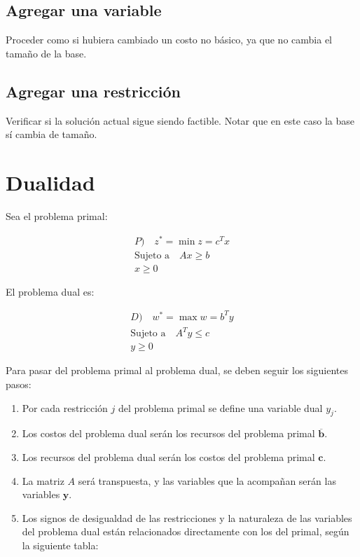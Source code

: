 \documentclass{article}
\begin{document}
\subsection{Agregar una variable}

Proceder como si hubiera cambiado un costo no básico, ya que no cambia el tamaño de la base.

\subsection{Agregar una restricción}

Verificar si la solución actual sigue siendo factible. Notar que en este caso la base sí cambia de tamaño.

\section{Dualidad}

Sea el problema primal:

\begin{align*}
    P) \quad z^* = \min z = c^T x \\
    \text{Sujeto a} \quad Ax \geq b \\
    x \geq 0
\end{align*}

El problema dual es:

\begin{align*}
    D) \quad w^* = \max w = b^T y \\
    \text{Sujeto a} \quad A^T y \leq c\\
    y \geq 0
\end{align*}

Para pasar del problema primal al problema dual, se deben seguir los siguientes pasos:

\begin{enumerate}
    \item Por cada restricción $j$ del problema primal se define una variable dual $y_j$.
    \item Los costos del problema dual serán los recursos del problema primal $\mathbf{\overline{b}}$.
    \item Los recursos del problema dual serán los costos del problema primal $\mathbf{c}$.
    \item La matriz $A$ será transpuesta, y las variables que la acompañan serán las variables $\mathbf{y}$.
    \item Los signos de desigualdad de las restricciones y la naturaleza de las variables del problema dual están relacionados directamente con los del primal, según la siguiente tabla:
\end{enumerate}
\end{document}
